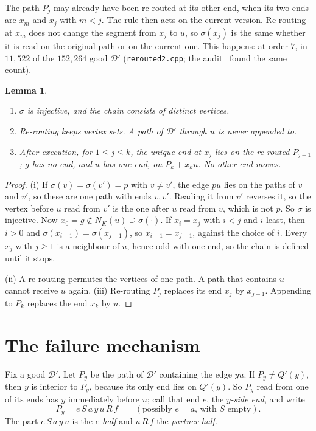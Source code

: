 \documentclass[11pt]{amsart}
\newtheorem{lemma}[theorem]{Lemma}
\theoremstyle{definition}
\newcommand{\cD}{\mathcal D}
\begin{document}
The path $P_j$ may already have been re-routed at its other end, when its two ends are $x_m$ and
$x_j$ with $m<j$. The rule then acts on the current version. Re-routing at $x_m$ does not change the
segment from $x_j$ to $u$, so $\sigma(x_j)$ is the same whether it is read on the original path or
on the current one. This happens: at order $7$, in $11{,}522$ of the $152{,}264$ good $\cD'$ (\texttt{rerouted2.cpp};
the audit~\cite{A34} found the same count).

\begin{lemma}\label{lem:chain}
\begin{enumerate}[label=(\roman*)]
\item $\sigma$ is injective, and the chain consists of distinct vertices.
\item Re-routing keeps vertex sets. A path of $\cD'$ through $u$ is never appended to.
\item After execution, for $1\le j\le k$, the unique end at $x_j$ lies on the re-routed $P_{j-1}$;
$g$ has no end, and $u$ has one end, on $P_k+x_ku$. No other end moves.
\end{enumerate}
\end{lemma}

\begin{proof}
(i) If $\sigma(v)=\sigma(v')=p$ with $v\ne v'$, the edge $pu$ lies on the paths of $v$ and $v'$, so
these are one path with ends $v,v'$. Reading it from $v'$ reverses it, so the vertex before $u$
read from $v'$ is the one after $u$ read from $v$, which is not $p$. So $\sigma$ is injective. Now
$x_0=g\notin N_K(u)\supseteq\sigma(\cdot)$. If $x_i=x_j$ with $i<j$ and $i$ least, then $i>0$ and
$\sigma(x_{i-1})=\sigma(x_{j-1})$, so $x_{i-1}=x_{j-1}$, against the choice of $i$. Every $x_j$
with $j\ge1$ is a neighbour of $u$, hence odd with one end, so the chain is defined until it stops.

(ii) A re-routing permutes the vertices of one path. A path that contains $u$ cannot receive $u$
again. (iii) Re-routing $P_j$ replaces its end $x_j$ by $x_{j+1}$. Appending to $P_k$ replaces
the end $x_k$ by $u$.
\end{proof}

\section{The failure mechanism}\label{sec:mech}

Fix a good $\cD'$. Let $P_y$ be the path of $\cD'$ containing the edge $yu$. If $P_y\ne Q'(y)$, then
$y$ is interior to $P_y$, because its only end lies on $Q'(y)$. So $P_y$ read from one of its ends
has $y$ immediately before $u$; call that end $e$, the \emph{$y$-side end}, and write
\[
P_y=e\,S\,a\,y\,u\,R\,f\qquad(\text{possibly }e=a\text{, with }S\text{ empty}).
\]
The part $e\,S\,a\,y\,u$ is the \emph{$e$-half} and $u\,R\,f$ the \emph{partner half}.
\end{document}
